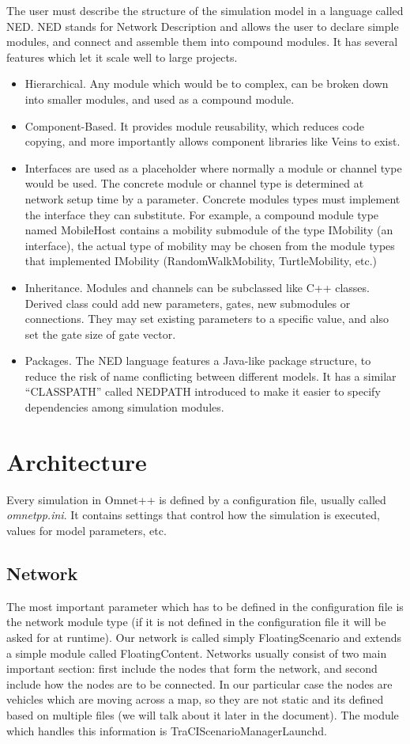 The user must describe the structure of the simulation model in a language
called NED. NED stands for Network Description and allows the user to declare
simple modules, and connect and assemble them into compound modules. It has
several features which let it scale well to large projects.

\begin{itemize}
  \item Hierarchical. Any module which would be to complex, can be broken down
  into smaller modules, and used as a compound module.
  \item Component-Based. It provides module reusability, which reduces code
  copying, and more importantly allows component libraries like Veins to exist.
  \item Interfaces are used as a placeholder where normally a module or channel
  type would be used. The concrete module or channel type is determined at
  network setup time by a parameter. Concrete modules types must implement the
  interface they can substitute. For example, a compound module type named
  MobileHost contains a mobility submodule of the type IMobility (an interface),
  the actual type of mobility may be chosen from the module types that
  implemented IMobility (RandomWalkMobility, TurtleMobility, etc.)
  \item Inheritance. Modules and channels can be subclassed like C++ classes.
  Derived class could add new parameters, gates, new submodules or connections.
  They may set existing parameters to a specific value, and also set the gate
  size of gate vector.
  \item Packages. The NED language features a Java-like package structure, to
  reduce the risk of name conflicting between different models. It has a similar
  ``CLASSPATH'' called NEDPATH introduced to make it easier to specify
  dependencies among simulation modules.
\end{itemize}

\section{Architecture}
Every simulation in Omnet++ is defined by a configuration file, usually called
{\it omnetpp.ini}. It contains settings that control how the simulation is
executed, values for model parameters, etc.

\subsection{Network}
The most important parameter which has to be defined in the configuration file
is the network module type (if it is not defined in the configuration file it
will be asked for at runtime). Our network is called simply FloatingScenario and
extends a simple module called FloatingContent. Networks usually consist
of two main important section: first include the nodes that form the network,
and second include how the nodes are to be connected. In our particular case the
nodes are vehicles which are moving across a map, so they are not static and its
defined based on multiple files (we will talk about it later in the document).
The module which handles this information is TraCIScenarioManagerLaunchd.

